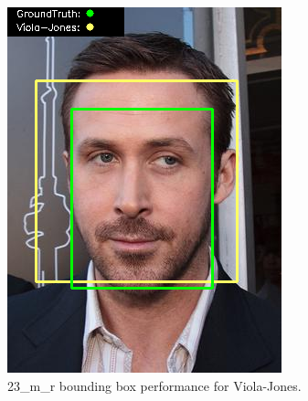 \documentclass{l4proj}
\begin{document}
\begin{appendices}
\begin{figure}[h!]
\begin{minipage}{0.49\textwidth}
     \includegraphics[width=\textwidth]{images/appendix/viola/23.png}
    \caption{23\_m\_r bounding box performance for Viola-Jones.}
    \label{whoopi_result}
  \end{minipage}
\end{figure}


\end{appendices}
\end{document}
